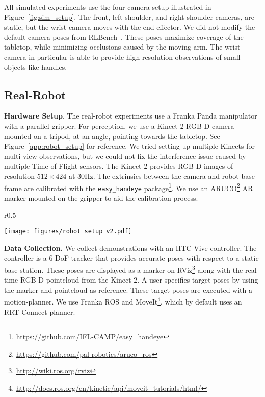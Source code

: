 \documentclass{article}
\newcommand{\figref}[1]{Figure~\ref{#1}}
\begin{document}
All simulated experiments use the four camera setup illustrated in \figref{fig:sim_setup}. The front, left shoulder, and right shoulder cameras, are static, but the wrist camera moves with the end-effector. We did not modify the default camera poses from RLBench~\citep{james2020rlbench}. These poses maximize coverage of the tabletop, while minimizing occlusions caused by the moving arm. The wrist camera in particular is able to provide high-resolution observations of small objects like handles. 

\vspace{0.6cm}
\subsection{Real-Robot}

\textbf{Hardware Setup}. The real-robot experiments use a Franka Panda manipulator with a parallel-gripper. For perception, we use a Kinect-2 RGB-D camera mounted on a tripod, at an angle, pointing towards the tabletop. See \figref{app:robot_setup} for reference. We tried setting-up multiple Kinects for multi-view observations, but we could not fix the interference issue caused by multiple Time-of-Flight sensors. The Kinect-2 provides RGB-D images of resolution $512 \times 424$ at 30Hz. The extrinsics between the camera and robot base-frame are calibrated with the \texttt{easy\_handeye}  package\footnote{\url{https://github.com/IFL-CAMP/easy_handeye}}. We use an ARUCO\footnote{\url{https://github.com/pal-robotics/aruco_ros}} AR marker mounted on the gripper to aid the calibration process. 

\begin{wrapfigure}[20]{r}{0.5\textwidth}
  \vspace{-0.7cm}
  \begin{center}
    \texttt{[image: figures/robot\_setup\_v2.pdf]}
  \caption{\textbf{Real-Robot Setup} with Kinect-2 and Franka Panda.}
  \label{fig:robot_setup}
  \end{center}
\end{wrapfigure}

\textbf{Data Collection.} We collect demonstrations with an HTC Vive controller. The controller is a 6-DoF tracker that provides accurate poses with respect to a static base-station. These poses are displayed as a marker on RViz\footnote{\url{http://wiki.ros.org/rviz}} along with the real-time RGB-D pointcloud from the Kinect-2. A user specifies target poses by using the marker and pointcloud as reference. These target poses are executed with a motion-planner. We use Franka ROS and MoveIt\footnote{\url{http://docs.ros.org/en/kinetic/api/moveit_tutorials/html/}}, which by default uses an RRT-Connect planner. 
\end{document}
